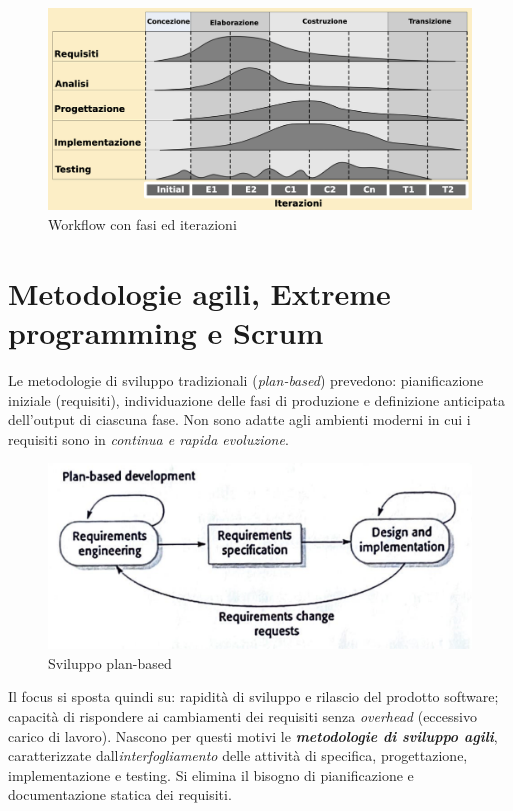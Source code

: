 \begin{figure}[h!]
    \centering
    \includegraphics[width=0.75\linewidth]{assets/rup_workflow.png}
    \caption{Workflow con fasi ed iterazioni}
    \label{fig:rup-workflow}
\end{figure}

\newpage

\section{Metodologie agili, Extreme programming e Scrum}

Le metodologie di sviluppo tradizionali (\textit{plan-based}) prevedono: pianificazione iniziale (requisiti), individuazione delle fasi di produzione e definizione anticipata dell'output di ciascuna fase. Non sono adatte agli ambienti moderni in cui i requisiti sono in \textit{continua e rapida evoluzione}.

\begin{figure}[h!]
    \centering
    \includegraphics[width=0.75\linewidth]{assets/plan-based.png}
    \caption{Sviluppo plan-based}
    \label{fig:plan-based-dev}
\end{figure}

Il focus si sposta quindi su: rapidità di sviluppo e rilascio del prodotto software; capacità di rispondere ai cambiamenti dei requisiti senza \textit{overhead} (eccessivo carico di lavoro). Nascono per questi motivi le \textit{\textbf{metodologie di sviluppo agili}}, caratterizzate dall\textit{interfogliamento} delle attività di specifica, progettazione, implementazione e testing. Si elimina il bisogno di pianificazione e documentazione statica dei requisiti.

